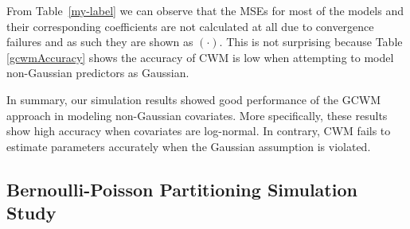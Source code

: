 \documentclass[12pt,letterpaper]{article}
\numberwithin{equation}{section}
\numberwithin{equation}{section}
\numberwithin{equation}{section}
\begin{document}
From Table~\ref{my-label} we can observe that the MSEs for most of the models and their corresponding coefficients are not calculated at all due to convergence failures and as such they are shown as $(\cdot)$. This is not surprising because Table \ref{gcwmAccuracy} shows the accuracy of CWM is low when attempting to model non-Gaussian predictors as Gaussian. 

In summary, our simulation results showed good performance of the GCWM approach in modeling non-Gaussian covariates. More specifically, these results show high accuracy when covariates are log-normal. In contrary, CWM fails to estimate parameters accurately when the Gaussian assumption is violated.

\subsection{Bernoulli-Poisson Partitioning Simulation Study}
\end{document}
